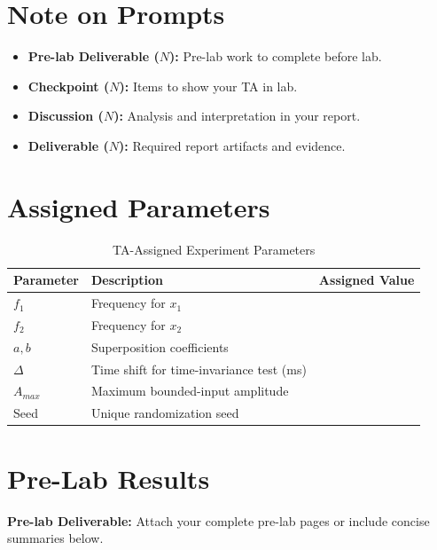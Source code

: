 \documentclass[11pt,letterpaper]{article}
\providecommand{\pldECE}[1]{\textcolor{BrickRed}{\textbf{Pre-lab Deliverable:} #1}}
\begin{document}
\section*{Note on Prompts}
\begin{itemize}
\item \color{BrickRed}\textbf{Pre-lab Deliverable ($N$): }Pre-lab work to complete before lab.\color{black}
\item \color{OliveGreen}\textbf{Checkpoint ($N$): }Items to show your TA in lab.\color{black}
\item \color{Plum}\textbf{Discussion ($N$): }Analysis and interpretation in your report.\color{black}
\item \color{BlueViolet}\textbf{Deliverable ($N$): }Required report artifacts and evidence.\color{black}
\end{itemize}

\clearpage

\section{Assigned Parameters}
\begin{table}[H]
    \centering
    \caption{TA-Assigned Experiment Parameters}
    \begin{tabularx}{\linewidth}{l X l}
    \toprule
    \textbf{Parameter} & \textbf{Description} & \textbf{Assigned Value}\\
    \midrule
    $f_1$ & Frequency for $x_1$ & \underline{\hspace{2.5cm}}\\
    $f_2$ & Frequency for $x_2$ & \underline{\hspace{2.5cm}}\\
    $a,b$ & Superposition coefficients & \underline{\hspace{2.5cm}}\\
    $\Delta$ & Time shift for time-invariance test (ms) & \underline{\hspace{2.5cm}}\\
    $A_{max}$ & Maximum bounded-input amplitude & \underline{\hspace{2.5cm}}\\
    Seed & Unique randomization seed & \underline{\hspace{2.5cm}}\\
    \bottomrule
    \end{tabularx}
\end{table}

\section{Pre-Lab Results}
\pldECE{Attach your complete pre-lab pages or include concise summaries below.}
\end{document}
